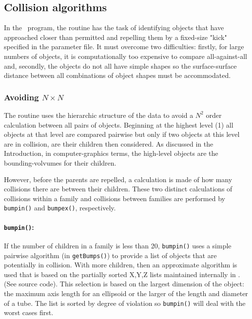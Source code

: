 \subsection{Collision algorithms}

In the \NAME\ program, the
 routine has the task of identifying objects that have approached closer
than permitted and repelling them by a fixed-size "kick" specified in the parameter file.
It must overcome two difficulties:  firstly, for large numbers of objects, it is
computationally too expensive to compare all-against-all and, secondly, the objects do not
all have simple shapes so the surface-surface distance between all combinations of
object shapes must be accommodated.

\subsubsection{Avoiding $N \times N$}

The  routine uses the hierarchic structure of the data to avoid a $N^2$
order calculation between all pairs of objects.  Beginning at the highest level (1)
all objects at that level are compared pairwise but only if two objects at this level
are in collision, are their children then considered. 
As discussed in the Introduction, in computer-graphics terms,
the high-level objects are the bounding-volvumes for their children. 

However, before the parents are repelled, a calculation is made of how many collisions
there are between their children.  These two distinct calculations of collisions
within a family and collisions between families are performed by {\tt bumpin()}
and {\tt bumpex()}, respectively.

\paragraph{{\tt \bfseries bumpin()}:\\}

If the number of children in a family is less than 20, {\tt bumpin()}
uses a simple pairwise algorithm (in {\tt getBumps()}) to provide a list of objects that
are potentially in collision.  With more children, then an approximate algorithm
is used that is based on the partially sorted X,Y,Z lists maintained internally in \NAME . (See
source code).  This selection is based on the largest dimension of the object:  the maximum
axis length for an ellipsoid or the larger of the length and diameter of a tube.  The list
is sorted by degree of violation so {\tt bumpin()} will deal with the worst cases first.

